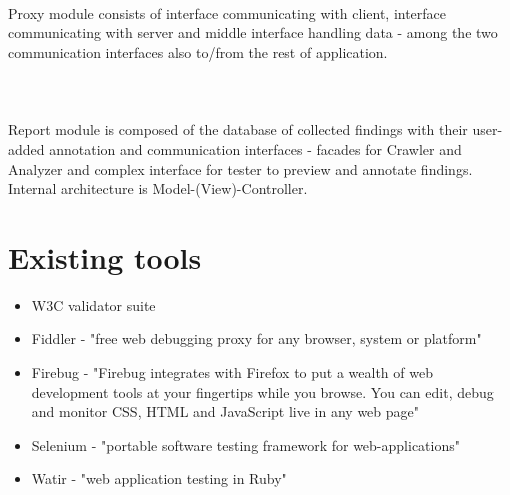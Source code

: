\documentclass[10pt]{article}
\begin{document}
\paragraph{~}Proxy module consists of interface communicating with client, interface communicating with server and middle interface handling data - among the two communication interfaces also to/from the rest of application.
\paragraph{~}Report module is composed of the database of collected findings with their user-added annotation and communication interfaces - facades for Crawler and Analyzer and complex interface for tester to preview and annotate findings. Internal architecture is Model-(View)-Controller.
\section{Existing tools}
\begin{itemize}
	\item W3C validator suite
	\item Fiddler - "free web debugging proxy for any browser, system or platform"
	\item Firebug - "Firebug integrates with Firefox to put a wealth of web development tools at your fingertips while you browse. You can edit, debug and monitor CSS, HTML and JavaScript live in any web page"
	\item Selenium - "portable software testing framework for web-applications"
	\item Watir - "web application testing in Ruby"
\end{itemize}	
\end{document}
